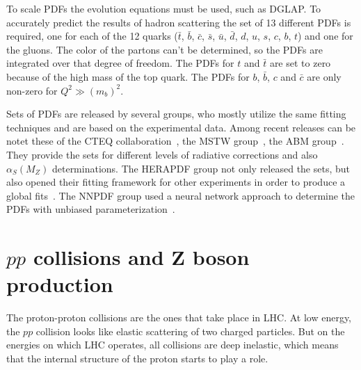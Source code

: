 To scale PDFs the evolution equations must be used, such as DGLAP. To accurately predict the results of hadron scattering the set of 13 different PDFs is required, one for each of the 12 quarks ($\bar{t}$, $\bar{b}$, $\bar{c}$, $\bar{s}$, $\bar{u}$, $\bar{d}$, $d$, $u$, $s$, $c$, $b$, $t$) and one for the gluons. The color of the partons can't be determined, so the PDFs are integrated over that degree of freedom. The PDFs for $t$ and $\bar{t}$ are set to zero because of the high mass of the top quark. The PDFs for $b$, $\bar{b}$, $c$ and $\bar{c}$ are only non-zero for $Q^{2} \gg (m_{b})^{2}$.

Sets of PDFs are released by several groups, who mostly utilize the same fitting techniques and are based on the experimental data. Among recent releases can be notet these of the CTEQ collaboration~\cite{lib:MC_pdfct10}, the MSTW group~\cite{lib:MC_pdfmstw1, lib:MC_pdfmstw2}, the ABM group~\cite{lib:MC_pdfabm}. They provide the sets for different levels of radiative corrections and also $\alpha_{S}(M_{Z})$ determinations. The HERAPDF group not only released the sets, but also opened their fitting framework for other experiments in order to produce a global fits~\cite{lib:MC_pdfhera}. The NNPDF group used a neural network approach to determine the PDFs with unbiased parameterization~\cite{lib:MC_nnpdf1,lib:MC_nnpdf2,lib:MC_nnpdf3}.

\section{$pp$ collisions and Z boson production}

The proton-proton collisions are the ones that take place in LHC. At low energy, the $pp$ collision looks like elastic scattering of two charged particles. But on the energies on which LHC operates, all collisions are deep inelastic, which means that the internal structure of the proton starts to play a role.

\begin{figure}
\end{figure}

